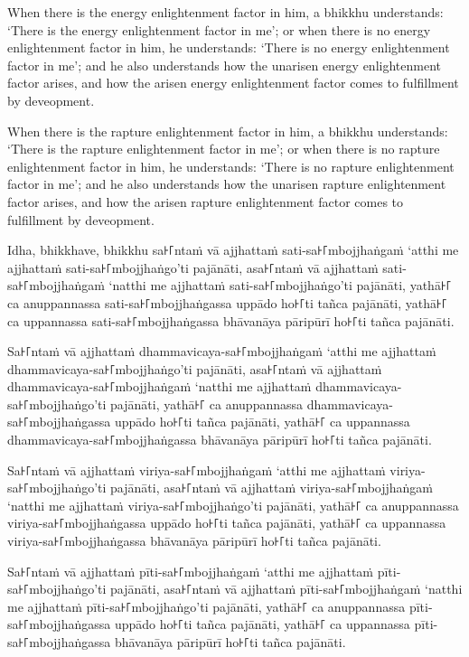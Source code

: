 When there is the energy enlightenment factor in him, a bhikkhu understands:
`There is the energy enlightenment factor in me'; or when there is no energy
enlightenment factor in him, he understands: `There is no energy enlightenment
factor in me'; and he also understands how the unarisen energy enlightenment
factor arises, and how the arisen energy enlightenment factor comes to
fulfillment by deveopment.

When there is the rapture enlightenment factor in him, a bhikkhu understands:
`There is the rapture enlightenment factor in me'; or when there is no rapture
enlightenment factor in him, he understands: `There is no rapture enlightenment
factor in me'; and he also understands how the unarisen rapture enlightenment
factor arises, and how the arisen rapture enlightenment factor comes to
fulfillment by deveopment.

\paliPage

Idha, bhikkhave, bhikkhu
sa꜔꜒ntaṁ vā ajjhattaṁ sati-sa꜔꜒mbojjhaṅgaṁ ‘atthi me ajjhattaṁ sati-sa꜔꜒mbojjhaṅgo’ti pajānāti,
asa꜔꜒ntaṁ vā ajjhattaṁ sati-sa꜔꜒mbojjhaṅgaṁ ‘natthi me ajjhattaṁ sati-sa꜔꜒mbojjhaṅgo’ti pajānāti,
yathā꜔꜒ ca anuppannassa sati-sa꜔꜒mbojjhaṅgassa uppādo ho꜔꜒ti tañca pajānāti,
yathā꜔꜒ ca uppannassa sati-sa꜔꜒mbojjhaṅgassa bhāvanāya pāripūrī ho꜔꜒ti tañca pajānāti.

Sa꜔꜒ntaṁ vā ajjhattaṁ dhammavicaya-sa꜔꜒mbojjhaṅgaṁ ‘atthi me ajjhattaṁ dhammavicaya-sa꜔꜒mbojjhaṅgo’ti pajānāti,
asa꜔꜒ntaṁ vā ajjhattaṁ dhammavicaya-sa꜔꜒mbojjhaṅgaṁ ‘natthi me ajjhattaṁ dhammavicaya-sa꜔꜒mbojjhaṅgo’ti pajānāti,
yathā꜔꜒ ca anuppannassa dhammavicaya-sa꜔꜒mbojjhaṅgassa uppādo ho꜔꜒ti tañca pajānāti,
yathā꜔꜒ ca uppannassa dhammavicaya-sa꜔꜒mbojjhaṅgassa bhāvanāya pāripūrī ho꜔꜒ti tañca pajānāti.

Sa꜔꜒ntaṁ vā ajjhattaṁ viriya-sa꜔꜒mbojjhaṅgaṁ ‘atthi me ajjhattaṁ viriya-sa꜔꜒mbojjhaṅgo’ti pajānāti,
asa꜔꜒ntaṁ vā ajjhattaṁ viriya-sa꜔꜒mbojjhaṅgaṁ ‘natthi me ajjhattaṁ viriya-sa꜔꜒mbojjhaṅgo’ti pajānāti,
yathā꜔꜒ ca anuppannassa viriya-sa꜔꜒mbojjhaṅgassa uppādo ho꜔꜒ti tañca pajānāti,
yathā꜔꜒ ca uppannassa viriya-sa꜔꜒mbojjhaṅgassa bhāvanāya pāripūrī ho꜔꜒ti tañca pajānāti.

Sa꜔꜒ntaṁ vā ajjhattaṁ pīti-sa꜔꜒mbojjhaṅgaṁ ‘atthi me ajjhattaṁ pīti-sa꜔꜒mbojjhaṅgo’ti pajānāti,
asa꜔꜒ntaṁ vā ajjhattaṁ pīti-sa꜔꜒mbojjhaṅgaṁ ‘natthi me ajjhattaṁ pīti-sa꜔꜒mbojjhaṅgo’ti pajānāti,
yathā꜔꜒ ca anuppannassa pīti-sa꜔꜒mbojjhaṅgassa uppādo ho꜔꜒ti tañca pajānāti,
yathā꜔꜒ ca uppannassa pīti-sa꜔꜒mbojjhaṅgassa bhāvanāya pāripūrī ho꜔꜒ti tañca pajānāti.

